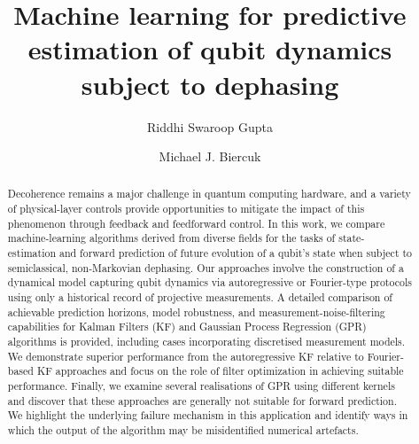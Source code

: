 
\title{Machine learning for predictive estimation of qubit dynamics subject to dephasing}

\author{Riddhi Swaroop Gupta} 

\author{Michael J. Biercuk}

\begin{abstract}
Decoherence remains a major challenge in quantum computing hardware, and a variety of physical-layer controls provide opportunities to mitigate the impact of this phenomenon through feedback and feedforward control. In this work, we compare machine-learning algorithms derived from diverse fields for the tasks of state-estimation and forward prediction of future evolution of a qubit's state when subject to semiclassical, non-Markovian dephasing. Our approaches involve the construction of a dynamical model capturing qubit dynamics via autoregressive or Fourier-type protocols using only a historical record of projective measurements.  A detailed comparison of achievable prediction horizons, model robustness, and measurement-noise-filtering capabilities for Kalman Filters (KF) and Gaussian Process Regression (GPR) algorithms is provided, including cases incorporating discretised measurement models. We demonstrate superior performance from the autoregressive KF relative to Fourier-based KF approaches and focus on the role of filter optimization in achieving suitable performance. Finally, we examine several realisations of GPR using different kernels and discover that these approaches are generally not suitable for forward prediction.  We highlight the underlying failure mechanism in this application and identify ways in which the output of the algorithm may be misidentified numerical artefacts.
\end{abstract}

\maketitle
